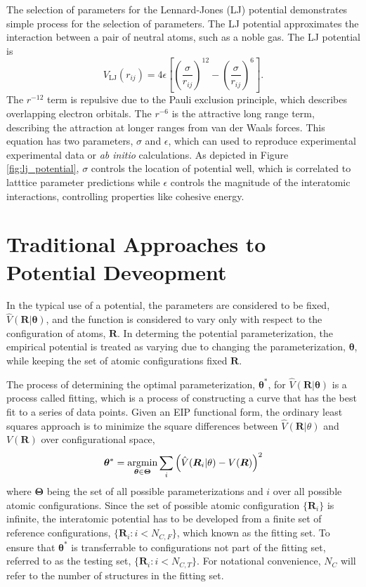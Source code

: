The selection of parameters for the Lennard-Jones (LJ)\cite{lennardjones1924_lj_pot} potential demonstrates simple process for the selection of parameters. The LJ potential approximates the interaction between a pair of neutral atoms, such as a noble gas.  The LJ potential is
\begin{equation}
	V_{\text{LJ}}(r_{ij}) = 4 \epsilon
    \left[
	\left(\frac{\sigma}{r_{ij}}\right)^{12}
	- \left(\frac{\sigma}{r_{ij}}\right)^{6}
    \right].
\end{equation}
The $r^{-12}$ term is repulsive due to the Pauli exclusion principle, which describes overlapping electron orbitals.  The $r^{-6}$ is the attractive long range term, describing the attraction at longer ranges from van der Waals forces.  This equation has two parameters, $\sigma$ and $\epsilon$, which can used to reproduce experimental experimental data or \emph{ab initio} calculations.  As depicted in Figure \ref{fig:lj_potential}, $\sigma$ controls the location of potential well, which is correlated to latttice parameter predictions while $\epsilon$ controls the magnitude of the interatomic interactions, controlling properties like cohesive energy.


\section{Traditional Approaches to Potential Deveopment}

In the typical use of a potential, the parameters are considered to be fixed, $\hat{V}(\bm{R}|\bm{\theta})$, and the function is considered to vary only with respect to the configuration of atoms, $\bm{R}$.  In determing the potential parameterization, the empirical potential is treated as varying due to changing the parameterization, $\bm{\theta}$, while keeping the set of atomic configurations fixed $\bm{R}$.

The process of determining the optimal parameterization, $\bm{\theta}^*$, for $\hat{V}(\bm{R}|\bm{\theta})$ is a process called fitting, which is a process of constructing a curve that has the best fit to a series of data points.  Given an EIP functional form,  the ordinary least squares approach is to minimize the square differences between $\hat{V}(\bm{R}|\theta)$ and $V(\bm{R})$ over configurational space,
\begin{equation}
\label{eq:energy_matching}
	\bm{\theta}^*
		= \argmin_{\bm{\theta}\in\bm{\Theta}}
					\sum_i \left(\hat{V}(\bm{R}_i|\theta) - V(\bm{R})\right)^2
\end{equation}
where $\bm{\Theta}$ being the set of all possible parameterizations and $i$ over all possible atomic configurations.  Since the set of possible atomic configuration $\{\bm{R}_i\}$ is infinite, the interatomic potential has to be developed from a finite set of reference configurations, $\{\bm{R}_i:i<N_{C,F}\}$, which known as the fitting set.  To ensure that $\bm{\theta}^*$ is transferrable to configurations not part of the fitting set, referred to as the testing set, $\{\bm{R}_i:i<N_{C,T}\}$.  For notational convenience, $N_C$ will refer to the number of structures in the fitting set.

